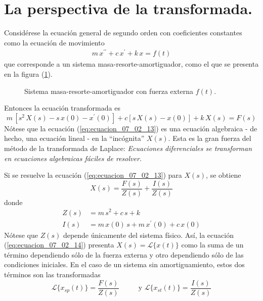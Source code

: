 \section{La perspectiva de la transformada.}
Considérese la ecuación general de segundo orden con coeficientes constantes como la ecuación de movimiento
\begin{align*}
m \, x^{\prime \prime} + c \, x^{\prime} + k \, x =  f(t)
\end{align*}
que corresponde a un sistema masa-resorte-amortiguador, como el que se presenta en la figura (\ref{fig:figura_07_02_07}).
\begin{figure}[!ht]
    \centering
    
    \caption{Sistema masa-resorte-amortiguador con fuerza externa $f(t)$.}
    \label{fig:figura_07_02_07}
\end{figure}
Entonces la ecuación transformada es
\begin{equation}
m \, [s^{2} \, X(s) - s \, x(0) - x^{\prime}(0) ] + c [ s \, X(s) - x(0) ] + k \, X(s) = F(s)
\label{eq:ecuacion_07_02_13}
\end{equation}
Nótese que la ecuación (\ref{eq:ecuacion_07_02_13}) es una ecuación algebraica  - de hecho, una ecuación lineal - en la \enquote{incógnita} $X(s)$. Esta es la gran fuerza del método de la transformada de Laplace: \emph{Ecuaciones diferenciales se transforman en ecuaciones algebraicas fáciles de resolver}.
\par
Si se resuelve la ecuación (\ref{eq:ecuacion_07_02_13}) para $X(s)$, se obtiene
\begin{equation}
X(s) = \dfrac{F(s)}{Z(s)} + \dfrac{I(s)}{Z(s)}
\label{eq:ecuacion_07_02_14}
\end{equation}
donde
\begin{align*}
Z(s) &= m \, s^{2} + c \, s + k \hspace{1cm} \\
I(s) &= m \, x(0) \, s + m \, x^{\prime} (0) + c \, x(0)
\end{align*}
Nótese que $Z(s)$ depende únicamente del sistema físico. Así, la ecuación (\ref{eq:ecuacion_07_02_14}) presenta $X(s)= \mathscr{L} \{ x(t)\} $ como la suma de un término dependiendo sólo de la fuerza externa y otro dependiendo sólo de las condiciones iniciales. En el caso de un sistema sin amortiguamiento, estos dos términos son las transformadas
\[ \mathscr{L} \{ x_{sp} (t) \} = \dfrac{F(s)}{Z(s)} \hspace{1cm} \mbox{ y } \mathscr{L} \{ x_{st} (t) \} = \dfrac{I(s)}{Z(s)} \]

